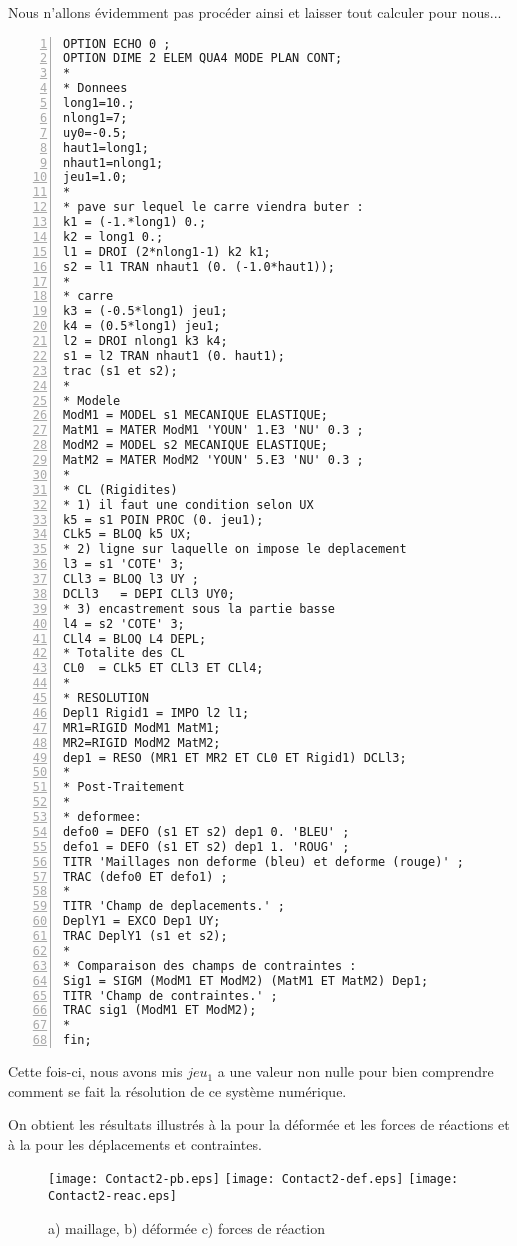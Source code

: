 Nous n'allons évidemment pas procéder ainsi et laisser \castem tout calculer pour nous...

\color{gris}\scriptsize
\begin{multicols}{2}
\begin{Verbatim}[numbers=left,numbersep=3pt]
OPTION ECHO 0 ;
OPTION DIME 2 ELEM QUA4 MODE PLAN CONT;
*
* Donnees
long1=10.;
nlong1=7;
uy0=-0.5;
haut1=long1;
nhaut1=nlong1;
jeu1=1.0;
*
* pave sur lequel le carre viendra buter :
k1 = (-1.*long1) 0.;
k2 = long1 0.;
l1 = DROI (2*nlong1-1) k2 k1;
s2 = l1 TRAN nhaut1 (0. (-1.0*haut1));
*
* carre
k3 = (-0.5*long1) jeu1;
k4 = (0.5*long1) jeu1;
l2 = DROI nlong1 k3 k4;
s1 = l2 TRAN nhaut1 (0. haut1);
trac (s1 et s2);
*
* Modele
ModM1 = MODEL s1 MECANIQUE ELASTIQUE;
MatM1 = MATER ModM1 'YOUN' 1.E3 'NU' 0.3 ;
ModM2 = MODEL s2 MECANIQUE ELASTIQUE;
MatM2 = MATER ModM2 'YOUN' 5.E3 'NU' 0.3 ;
*
* CL (Rigidites)
* 1) il faut une condition selon UX
k5 = s1 POIN PROC (0. jeu1);
CLk5 = BLOQ k5 UX;
* 2) ligne sur laquelle on impose le deplacement
l3 = s1 'COTE' 3;
CLl3 = BLOQ l3 UY ;
DCLl3   = DEPI CLl3 UY0;
* 3) encastrement sous la partie basse
l4 = s2 'COTE' 3;
CLl4 = BLOQ L4 DEPL;
* Totalite des CL
CL0  = CLk5 ET CLl3 ET CLl4;
*
* RESOLUTION
Depl1 Rigid1 = IMPO l2 l1;
MR1=RIGID ModM1 MatM1;
MR2=RIGID ModM2 MatM2;
dep1 = RESO (MR1 ET MR2 ET CL0 ET Rigid1) DCLl3;
*
* Post-Traitement
*
* deformee:
defo0 = DEFO (s1 ET s2) dep1 0. 'BLEU' ;
defo1 = DEFO (s1 ET s2) dep1 1. 'ROUG' ;
TITR 'Maillages non deforme (bleu) et deforme (rouge)' ;
TRAC (defo0 ET defo1) ;
*
TITR 'Champ de deplacements.' ;
DeplY1 = EXCO Dep1 UY;
TRAC DeplY1 (s1 et s2);
*
* Comparaison des champs de contraintes :
Sig1 = SIGM (ModM1 ET ModM2) (MatM1 ET MatM2) Dep1;
TITR 'Champ de contraintes.' ;
TRAC sig1 (ModM1 ET ModM2);
*
fin;
\end{Verbatim}
\end{multicols}
\color{black}\normalsize

\medskip
Cette fois-ci, nous avons mis $jeu_1$ a une valeur non nulle pour bien comprendre
comment se fait la résolution de ce système numérique.

On obtient les résultats illustrés à la  pour la déformée et les forces de réactions et à la 
pour les déplacements et contraintes.

\begin{figure}[ht]
   \texttt{[image: Contact2-pb.eps]} \hfill 
   \texttt{[image: Contact2-def.eps]}\hfill 
   \texttt{[image: Contact2-reac.eps]}
   \caption{\label{Fig-Cont21} a) maillage, b) déformée c) forces de réaction}
\end{figure}

